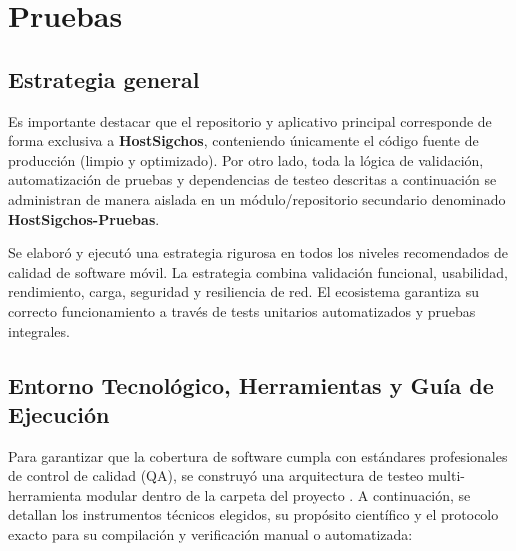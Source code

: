 \documentclass[12pt,letterpaper]{report}
\newcommand{\pathtext}[1]{\texttt{\detokenize{#1}}}
\begin{document}
\chapter{Pruebas}

\section{Estrategia general}
Es importante destacar que el repositorio y aplicativo principal corresponde de forma exclusiva a \textbf{HostSigchos}, conteniendo únicamente el código fuente de producción (limpio y optimizado). Por otro lado, toda la lógica de validación, automatización de pruebas y dependencias de testeo descritas a continuación se administran de manera aislada en un módulo/repositorio secundario denominado \textbf{HostSigchos-Pruebas}.

Se elaboró y ejecutó una estrategia rigurosa en todos los niveles recomendados de calidad de software móvil. La estrategia combina validación funcional, usabilidad, rendimiento, carga, seguridad y resiliencia de red. El ecosistema garantiza su correcto funcionamiento a través de tests unitarios automatizados y pruebas integrales.

\section{Entorno Tecnológico, Herramientas y Guía de Ejecución}
Para garantizar que la cobertura de software cumpla con estándares profesionales de control de calidad (QA), se construyó una arquitectura de testeo multi-herramienta modular dentro de la carpeta del proyecto \pathtext{HostSigchos-Tests}. A continuación, se detallan los instrumentos técnicos elegidos, su propósito científico y el protocolo exacto para su compilación y verificación manual o automatizada:
\end{document}
